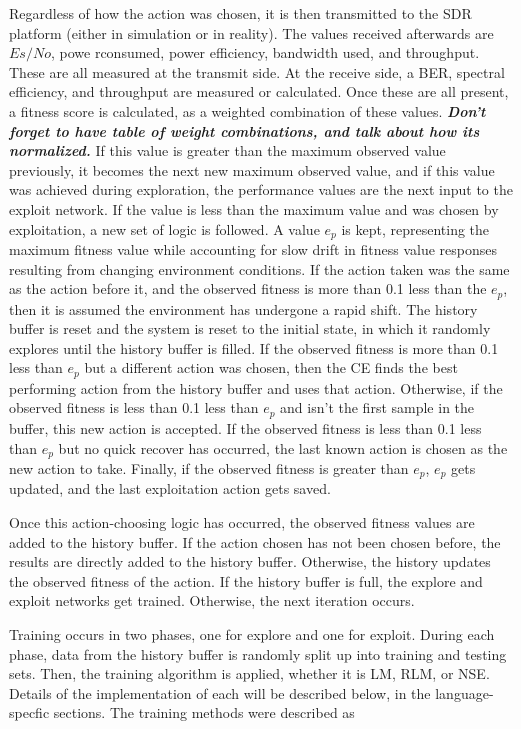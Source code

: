 \par Regardless of how the action was chosen, it is then transmitted to the SDR platform (either in simulation or in reality). The values received afterwards are $Es/No$, powe rconsumed, power efficiency, bandwidth used, and throughput. These are all measured at the transmit side. At the receive side, a BER, spectral efficiency, and throughput are measured or calculated. Once these are all present, a fitness score is calculated, as a weighted combination of these values. \textbf{\textit{Don't forget to have table of weight combinations, and talk about how its normalized.}} If this value is greater than the maximum observed value previously, it becomes the next new maximum observed value, and if this value was achieved during exploration, the performance values are the next input to the exploit network. If the value is less than the maximum value and was chosen by exploitation, a new set of logic is followed. A value $e_p$ is kept, representing the maximum fitness value while accounting for slow drift in fitness value responses resulting from changing environment conditions. If the action taken was the same as the action before it, and the observed fitness is more than 0.1 less than the $e_p$, then it is assumed the environment has undergone a rapid shift. The history buffer is reset and the system is reset to the initial state, in which it randomly explores until the history buffer is filled.  If the observed fitness is more than 0.1 less than $e_p$ but a different action was chosen, then the CE finds the best performing action from the history buffer and uses that action. Otherwise, if the observed fitness is less than 0.1 less than $e_p$ and isn't the first sample in the buffer, this new action is accepted. If the observed fitness is less than 0.1 less than $e_p$ but no quick recover has occurred, the last known action is chosen as the new action to take. Finally, if the observed fitness is greater than $e_p$, $e_p$ gets updated, and the last exploitation action gets saved. 
\par Once this action-choosing logic has occurred, the observed fitness values are added to the history buffer. If the action chosen has not been chosen before, the results are directly added to the history buffer. Otherwise, the history updates the observed fitness of the action. If the history buffer is full, the explore and exploit networks get trained. Otherwise, the next iteration occurs.
\par Training occurs in two phases, one for explore and one for exploit. During each phase, data from the history buffer is randomly split up into training and testing sets. Then, the training algorithm is applied, whether it is LM, RLM, or NSE. Details of the implementation of each will be described below, in the language-specfic sections. The training methods were described as 
